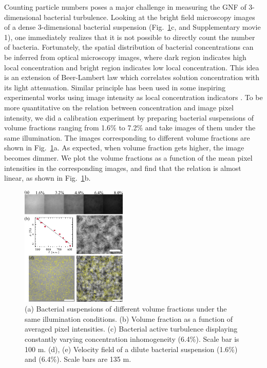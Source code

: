 \documentclass[twocolumn,aps,prl,amsmath,amssymb,longbibliography]{revtex4-2}
\begin{document}
Counting particle numbers poses a major challenge in measuring the GNF of 3-dimensional bacterial turbulence. Looking at the bright field microscopy images of a dense 3-dimensional bacterial suspension (Fig.~\ref{fig:1}c, and Supplementary movie 1), one immediately realizes that it is not possible to directly count the number of bacteria. Fortunately, the spatial distribution of bacterial concentrations can be inferred from optical microscopy images, where dark region indicates high local concentration and bright region indicates low local concentration. This idea is an extension of Beer-Lambert law which correlates solution concentration with its light attenuation. Similar principle has been used in some inspiring experimental works using image intensity as local concentration indicators \cite{Wilson2011, Schaller2013}. To be more quantitative on the relation between concentration and image pixel intensity, we did a calibration experiment by preparing bacterial suspensions of volume fractions ranging from 1.6\% to 7.2\% and take images of them under the same illumination. The images corresponding to different volume fractions are shown in Fig.~\ref{fig:1}a. As expected, when volume fraction gets higher, the image becomes dimmer. We plot the volume fractions as a function of the mean pixel intensities in the corresponding images, and find that the relation is almost linear, as shown in Fig.~\ref{fig:1}b.


\begin{figure}[h]
\begin{center}
\includegraphics[width=0.45\textwidth]{figures/fig-1/v3.pdf}
\caption[Experimental details]
{
(a) Bacterial suspensions of different volume fractions under the same illumination conditions.
(b) Volume fraction as a function of averaged pixel intensities.
(c) Bacterial active turbulence displaying constantly varying concentration inhomogeneity (6.4\%). Scale bar is 100 \textmu m.
(d), (e) Velocity field of a dilute bacterial suspension (1.6\%) and (6.4\%). Scale bars are 135 \textmu m.
}
\label{fig:1}
\end{center}
\end{figure}
\end{document}
